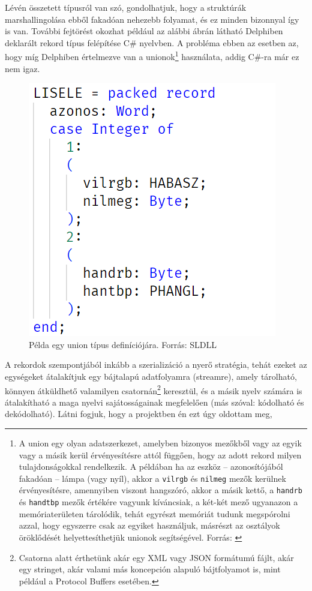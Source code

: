 \documentclass[tocnopagenum]{thesis-ekf}
\begin{document}
	Lévén összetett típusról van szó, gondolhatjuk, hogy a struktúrák marshallingolása ebből fakadóan nehezebb folyamat, és ez minden bizonnyal így is van. További fejtörést okozhat például az alábbi ábrán látható Delphiben deklarált rekord típus felépítése C\# nyelvben. A probléma ebben az esetben az, hogy míg Delphiben értelmezve van a unionok\footnote{A union egy olyan adatszerkezet, amelyben bizonyos mezőkből vagy az egyik vagy a másik kerül érvényesítésre attól függően, hogy az adott rekord milyen tulajdonságokkal rendelkezik. A példában ha az eszköz -- azonosítójából fakadóan -- lámpa (vagy nyíl), akkor a \verb*|vilrgb| és \verb*|nilmeg| mezők kerülnek érvényesítésre, amennyiben viszont hangszóró, akkor a másik kettő, a \verb*|handrb| és \verb*|handtbp| mezők értékére vagyunk kíváncsiak, a két-két mező ugyanazon a memóriaterületen tárolódik, tehát egyrészt memóriát tudunk megspórolni azzal, hogy egyszerre csak az egyiket használjuk, másrészt az osztályok öröklődését helyettesíthetjük unionok segítségével. Forrás: \cite{jsorber_unions}} használata, addig C\#-ra már ez nem igaz.
	
	\begin{figure}[H]
		\centering
		\includegraphics[scale=0.7]{sldll_union}
		\caption{Példa egy union típus definíciójára. Forrás: SLDLL}
		\label{fig:sldll_union}
	\end{figure}
	
	A rekordok szempontjából inkább a szerializáció a nyerő stratégia, tehát ezeket az egységeket átalakítjuk egy bájtalapú adatfolyamra (streamre), amely tárolható, könnyen átküldhető valamilyen csatornán\footnote{Csatorna alatt érthetünk akár egy XML vagy JSON formátumú fájlt, akár egy stringet, akár valami más koncepción alapuló bájtfolyamot is, mint például a Protocol Buffers esetében.} keresztül, és a másik nyelv számára is átalakítható a maga nyelvi sajátosságainak megfelelően (más szóval: kódolható és dekódolható).
	Látni fogjuk, hogy a projektben én ezt úgy oldottam meg,
\end{document}
